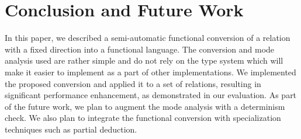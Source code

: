 \section{Conclusion and Future Work}
\label{sec:conclusion}

In this paper, we described a semi-automatic functional conversion of a \mk relation with a fixed direction into a functional language.
The conversion and mode analysis used are rather simple and do not rely on the type system which will make it easier to implement as a part of other \mk implementations.
We implemented the proposed conversion and applied it to a set of relations, resulting in significant performance enhancement, as demonstrated in our evaluation.
As part of the future work, we plan to augment the mode analysis with a determinism check.
We also plan to integrate the functional conversion with specialization techniques such as partial deduction.
